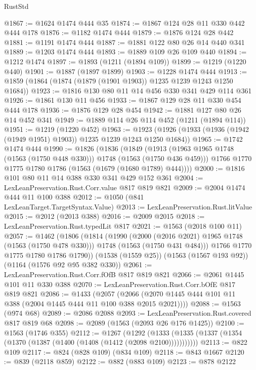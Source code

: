 \begin{lexlean}{RustStd}
\begin{coremodule}
@1867 := @1624 @1474 @444 @35
@1874 := @1867 @124 @28 @11 @330 @442 @444 @178
@1876 := @1182 @1474 @444
@1879 := @1876 @124 @28 @442
@1881 := @1191 @1474 @444
@1887 := @1881 @122 @80 @26 @14 @440 @341
@1889 := @1203 @1474 @444
@1893 := @1889 @109 @26 @109 @440
@1894 := @1212 @1474
@1897 := @1893 (@1211 (@1894 @109))
@1899 := @1219 (@1220 @440)
@1901 := @1887 (@1897 @1899)
@1903 := @1228 @1474 @444
@1913 := @1859 (@1864 (@1874 (@1879 (@1901 @1903)) @1235 @1239 @1243 @1250 @1684))
@1923 := @1816 @130 @80 @11 @14 @456 @330 @341 @429 @114 @361
@1926 := @1861 @130 @11 @456
@1933 := @1867 @129 @28 @11 @330 @454 @444 @178
@1936 := @1876 @129 @28 @454
@1942 := @1881 @127 @80 @26 @14 @452 @341
@1949 := @1889 @114 @26 @114 @452 (@1211 (@1894 @114))
@1951 := @1219 (@1220 @452)
@1963 := @1923 (@1926 (@1933 (@1936 (@1942 (@1949 @1951) @1903)) @1235 @1239 @1243 @1250 @1684))
@1965 := @1742 @1474 @444
@1990 := @1826
    (@1836
      (@1849
        (@1913 (@1963 @1965 @1748 (@1563 (@1750 @448 @330))) @1748 (@1563 (@1750 @436 @459)))
        @1766
        @1770
        @1775
        @1780
        @1786
        (@1563 (@1679 (@1680 @1789) @444))))
@2000 := @1816 @101 @80 @11 @14 @388 @330 @341 @429 @152 @361
@2004 := LexLeanPreservation.Rust.Corr.value @817 @819 @821
@2009 := @2004 @1474 @444 @11 @100 @388
@2012 := @1050 (@841 LexLeanTarget.TargetSyntax.Value)
@2013 := LexLeanPreservation.Rust.litValue
@2015 := @2012 (@2013 @388)
@2016 := @2009 @2015
@2018 := LexLeanPreservation.Rust.typedLit @817
@2021 := @1563 (@2018 @100 @11)
@2057 := @1462
    (@1806
      (@1814
        (@1990
          (@2000 (@2016 @2021) @1965 @1748 (@1563 (@1750 @478 @330)))
          @1748
          (@1563 (@1750 @431 @484)))
        @1766
        @1770
        @1775
        @1780
        @1786
        @1790))
    (@1538 (@1559 @25))
    (@1563 (@1567 @193 @92))
    (@1164 (@1576 @92 @95 @382 @330))
@2061 := LexLeanPreservation.Rust.Corr.fOfB @817 @819 @821
@2066 := @2061 @1445 @101 @11 @330 @388
@2070 := LexLeanPreservation.Rust.Corr.bOfE @817 @819 @821
@2086 := @1433
    (@2057 (@2066 (@2070 @1445 @444 @101 @11 @388 (@2004 @1445 @444 @11 @100 @388 @2015 @2021))))
@2088 := @1563 (@974 @68)
@2089 := @2086 @2088
@2093 := LexLeanPreservation.Rust.covered @817 @819 @68
@2098 := @2089 (@1563 (@2093 @26 @176 @1425))
@2100 := @1563 (@1746 @355)
@2112 := @1267
    (@1292 (@1333 (@1335 (@1337 (@1354 (@1370 (@1387 (@1400 (@1408 (@1412 (@2098 @2100)))))))))))
@2113 := @822 @109
@2117 := @824 (@828 @109) (@834 @109)
@2118 := @843 @1667
@2120 := @839 (@2118 @859)
@2122 := @882 (@883 @109)
@2123 := @878 @2122

\end{coremodule}
\end{lexlean}
